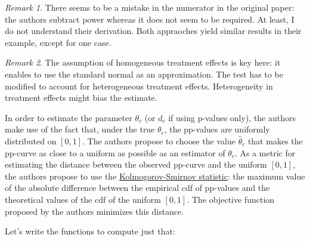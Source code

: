\documentclass[
]{book}
\theoremstyle{definition}
\theoremstyle{definition}
\theoremstyle{definition}
\theoremstyle{definition}
\theoremstyle{remark}
\newtheorem*{remark}{Remark}
\begin{document}
\begin{remark}
\iffalse{} {Remark. } \fi{}There seems to be a mistake in the numerator in the original paper: the authors subtract power whereas it does not seem to be required.
At least, I do not understand their derivation.
Both appraoches yield similar results in their example, except for one case.
\end{remark}

\begin{remark}
\iffalse{} {Remark. } \fi{}The assumption of homogeneous treatment effects is key here: it enables to use the standard normal as an approximation.
The test has to be modified to account for heterogeneous treatment effects.
Heterogeneity in treatment effects might bias the estimate.
\end{remark}

In order to estimate the parameter \(\theta_c\) (or \(d_c\) if using p-values only), the authors make use of the fact that, under the true \(\theta_c\), the pp-values are uniformly distributed on \(\left[0,1\right]\).
The authors propose to choose the value \(\hat{\theta}_c\) that makes the pp-curve as close to a uniform as possible as an estimator of \(\theta_c\).
As a metric for estimating the distance between the observed pp-curve and the uniform \(\left[0,1\right]\), the authors propose to use the \href{https://en.wikipedia.org/wiki/Kolmogorov–Smirnov_test}{Kolmogorov-Smirnov statistic}: the maximum value of the absolute difference between the empirical cdf of pp-values and the theoretical values of the cdf of the uniform \(\left[0,1\right]\).
The objective function proposed by the authors minimizes this distance.

Let's write the functions to compute just that:
\end{document}
